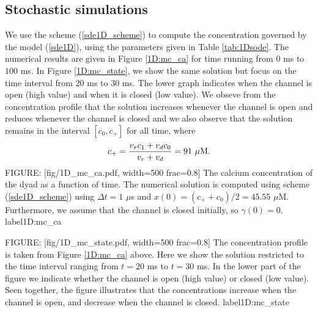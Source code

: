 \subsection{Stochastic simulations}


We use the scheme (\ref{sde1D_scheme}) to compute the concentration governed by the model  (\ref{sde1D}),
using the parameters given in Table \ref{tab:1Dsode}.
The numerical results are given in Figure 
\ref{1D:mc_ca} for time running from $0$ ms to $100$ ms. In Figure  \ref{1D:mc_state}, we show the same solution but focus on the time interval from $20$ ms to $30$ ms. The lower graph indicates when the channel is open (high value) and when it is closed (low value). We obseve from the concentration profile that the solution increases whenever the channel is open and reduces whenever the channel is closed and we also observe that the solution remains in the interval $[c_{0} ,c_{+}]$ for all time, where
\[
c_{+}=\frac{v_{r}c_{1}+v_{d}c_{0}}{v_{r}+v_{d}}=91\text{ }\rm{\mu M}.
\]
FIGURE: [fig/1D_mc_ca.pdf, width=500 frac=0.8] The calcium concentration of the dyad as a function of time. The numerical solution is computed using scheme  (\ref{sde1D_scheme}) using $\Delta t =1$ $\mu$s and
$x(0) = (c_{+} +c_0)/2 = 45.55$ $\mu$M. Furthermore, we assume that the channel is closed initially, so $\gamma(0)=0$.  label{1D:mc_ca}%


FIGURE: [fig/1D_mc_state.pdf, width=500 frac=0.8]  The concentration profile is taken from Figure \ref{1D:mc_ca} above. Here we show the solution restricted to the time interval ranging from $t=20$ ms to $t=30$ ms. In the lower part of the figure we indicate whether the channel is open (high value) or closed (low value). Seen together, the figure illustrates that the concentrations increase when the channel is open, and decrease when the channel is closed.   label{1D:mc_state}

